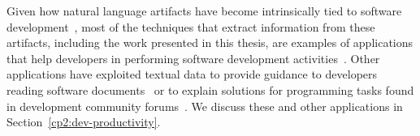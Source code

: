 Given how 
natural language artifacts have become intrinsically
tied to software development~\cite{liu2021, watson2022, umarji2008archetypal},
most of the techniques that extract information from these artifacts, including the work presented in this thesis, 
are examples of applications that help developers in performing 
software development activities~\cite{Meyer2017}. 
Other applications have exploited textual data
to provide guidance to developers reading software documents~\cite{Treude2016,  robillard2017} 
or  to  explain solutions for programming tasks found in development community forums~\cite{silva2019}.
We discuss these and other applications in Section~\ref{cp2:dev-productivity}.








